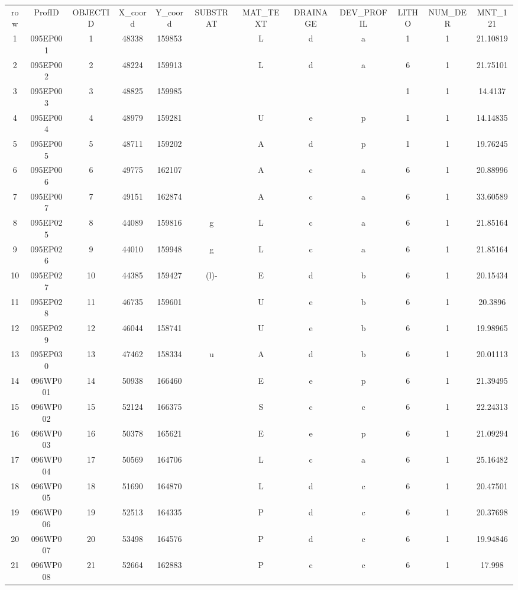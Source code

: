 \begin{tabular}{|*{12}{c|}}
row & ProfID & OBJECTID & X\_coord & Y\_coord & SUBSTRAT & MAT\_TEXT & DRAINAGE & DEV\_PROFIL & LITHO & NUM\_DER & MNT\_121 \\ 
1 & 095EP001 & 1 & 48338 & 159853 &  & L & d & a & 1 & 1 & 21.10819 \\ 
2 & 095EP002 & 2 & 48224 & 159913 &  & L & d & a & 6 & 1 & 21.75101 \\ 
3 & 095EP003 & 3 & 48825 & 159985 &  &  &  &  & 1 & 1 & 14.4137 \\ 
4 & 095EP004 & 4 & 48979 & 159281 &  & U & e & p & 1 & 1 & 14.14835 \\ 
5 & 095EP005 & 5 & 48711 & 159202 &  & A & d & p & 1 & 1 & 19.76245 \\ 
6 & 095EP006 & 6 & 49775 & 162107 &  & A & c & a & 6 & 1 & 20.88996 \\ 
7 & 095EP007 & 7 & 49151 & 162874 &  & A & c & a & 6 & 1 & 33.60589 \\ 
8 & 095EP025 & 8 & 44089 & 159816 & g & L & c & a & 6 & 1 & 21.85164 \\ 
9 & 095EP026 & 9 & 44010 & 159948 & g & L & c & a & 6 & 1 & 21.85164 \\ 
10 & 095EP027 & 10 & 44385 & 159427 & (l)- & E & d & b & 6 & 1 & 20.15434 \\ 
11 & 095EP028 & 11 & 46735 & 159601 &  & U & e & b & 6 & 1 & 20.3896 \\ 
12 & 095EP029 & 12 & 46044 & 158741 &  & U & e & b & 6 & 1 & 19.98965 \\ 
13 & 095EP030 & 13 & 47462 & 158334 & u & A & d & b & 6 & 1 & 20.01113 \\ 
14 & 096WP001 & 14 & 50938 & 166460 &  & E & e & p & 6 & 1 & 21.39495 \\ 
15 & 096WP002 & 15 & 52124 & 166375 &  & S & c & c & 6 & 1 & 22.24313 \\ 
16 & 096WP003 & 16 & 50378 & 165621 &  & E & e & p & 6 & 1 & 21.09294 \\ 
17 & 096WP004 & 17 & 50569 & 164706 &  & L & c & a & 6 & 1 & 25.16482 \\ 
18 & 096WP005 & 18 & 51690 & 164870 &  & L & d & c & 6 & 1 & 20.47501 \\ 
19 & 096WP006 & 19 & 52513 & 164335 &  & P & d & c & 6 & 1 & 20.37698 \\ 
20 & 096WP007 & 20 & 53498 & 164576 &  & P & d & c & 6 & 1 & 19.94846 \\ 
21 & 096WP008 & 21 & 52664 & 162883 &  & P & c & c & 6 & 1 & 17.998 \\ 

\end{tabular}
